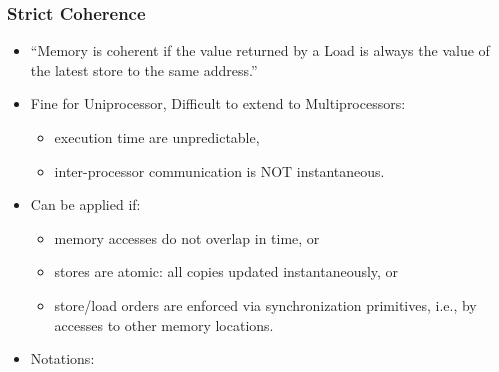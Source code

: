 \documentclass{beamer}
\renewcommand{\emph}[1]{\textcolor{structure}{#1}}
\newcommand{\emp}[1]{\textcolor{DikuRed}{ #1}}
\begin{document}
\begin{frame}[fragile,t]
\frametitle{Strict Coherence}

\begin{itemize}
    \item \emph{``Memory is coherent if the value returned by a Load
            is always the value of the latest store to the same 
            address.''}\medskip

    \item Fine for Uniprocessor, \emp{Difficult to extend to Multiprocessors}:
        \begin{itemize}
            \item execution time are unpredictable,
            \item inter-processor communication is NOT instantaneous.
        \end  {itemize}\smallskip

    \item \emp{Can be applied if}:
        \begin{itemize}
            \item memory accesses do not overlap in time, or
            \item \emp{stores are atomic}: all copies updated instantaneously, or
            \item store/load orders are enforced via synchronization 
                    primitives, i.e., by accesses to other memory locations.
        \end  {itemize}\smallskip

    \item \emp{Notations:}
\end{itemize}
\vspace{-3ex}


\end{frame}
\end{document}
